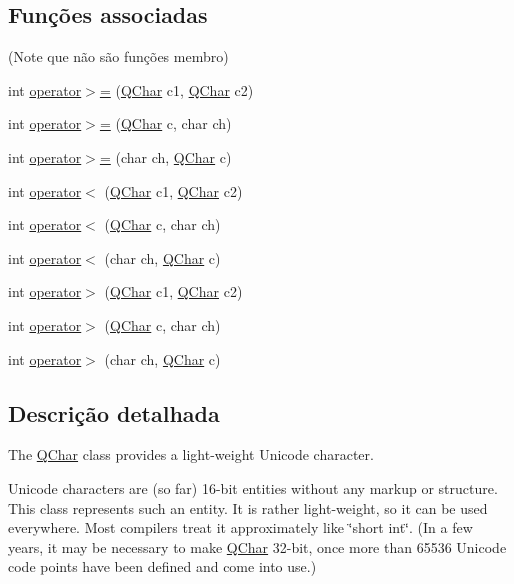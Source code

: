 \subsection*{Funções associadas}
(Note que não são funções membro) \begin{DoxyCompactItemize}
\item 
int \hyperlink{class_q_char_a4b5fd192cc790217e8be92350c712f96}{operator$>$=} (\hyperlink{class_q_char}{Q\-Char} c1, \hyperlink{class_q_char}{Q\-Char} c2)
\item 
int \hyperlink{class_q_char_a76a11bfd8c91c16da6b67111e0f425f5}{operator$>$=} (\hyperlink{class_q_char}{Q\-Char} c, char ch)
\item 
int \hyperlink{class_q_char_acaf747a14f95126f00a60b1e25826449}{operator$>$=} (char ch, \hyperlink{class_q_char}{Q\-Char} c)
\item 
int \hyperlink{class_q_char_a15002b2e206a26c172b93257b8502dd5}{operator$<$} (\hyperlink{class_q_char}{Q\-Char} c1, \hyperlink{class_q_char}{Q\-Char} c2)
\item 
int \hyperlink{class_q_char_a71f5a053f96ceccb5a6cbeb88a164235}{operator$<$} (\hyperlink{class_q_char}{Q\-Char} c, char ch)
\item 
int \hyperlink{class_q_char_a1337fd200b0e581e8ac7f54460bbbc39}{operator$<$} (char ch, \hyperlink{class_q_char}{Q\-Char} c)
\item 
int \hyperlink{class_q_char_abc2415ff906b00a6fd8fda1587a5a8de}{operator$>$} (\hyperlink{class_q_char}{Q\-Char} c1, \hyperlink{class_q_char}{Q\-Char} c2)
\item 
int \hyperlink{class_q_char_a4c094bd4eb0c8476013d9c453278e66a}{operator$>$} (\hyperlink{class_q_char}{Q\-Char} c, char ch)
\item 
int \hyperlink{class_q_char_a73c1424f57eae2e721b34e5e242fa39d}{operator$>$} (char ch, \hyperlink{class_q_char}{Q\-Char} c)
\end{DoxyCompactItemize}


\subsection{Descrição detalhada}
The \hyperlink{class_q_char}{Q\-Char} class provides a light-\/weight Unicode character. 

Unicode characters are (so far) 16-\/bit entities without any markup or structure. This class represents such an entity. It is rather light-\/weight, so it can be used everywhere. Most compilers treat it approximately like \char`\"{}short int\char`\"{}. (In a few years, it may be necessary to make \hyperlink{class_q_char}{Q\-Char} 32-\/bit, once more than 65536 Unicode code points have been defined and come into use.)

